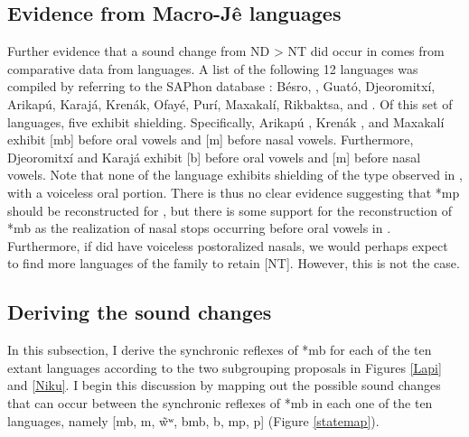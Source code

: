 \documentclass[output=paper,hidelinks]{langscibook}
\begin{document}
\subsection{Evidence from Macro-Jê languages}

Further evidence that a sound change from ND > NT did occur in  comes from comparative data from  languages. A list of the following 12  languages was compiled by referring to the SAPhon database \citep{saphon}: B\'es\textbari ro, , Guat\'o, Djeoromitx\'i, Arikap\'u, Karaj\'a, Kren\'ak, Ofay\'e, Pur\'i, Maxakal\'i, Rikbaktsa, and . Of this set of languages, five exhibit shielding. Specifically, Arikap\'u \citep{RibeiroVoort2010}, Kren\'ak \citep{Pessoa2012}, and Maxakal\'i \citep{Campos2009} exhibit [mb] before oral vowels and [m] before nasal vowels. Furthermore, Djeoromitx\'i \citep{RibeiroVoort2010} and Karaj\'a \citep{Ribeiro2012} exhibit [b] before oral vowels and [m] before nasal vowels. Note that none of the  language exhibits shielding of the type observed in , with a voiceless oral portion. There is thus no clear evidence suggesting that *mp should be reconstructed for , but there is some support for the reconstruction of *mb as the realization of nasal stops occurring before oral vowels in . Furthermore, if  did have voiceless postoralized nasals, we would perhaps expect to find more languages of the family to retain [NT]. However, this is not the case.

\subsection{Deriving the sound changes}

In this subsection, I derive the synchronic reflexes of  *mb for each of the ten extant  languages according to the two subgrouping proposals in Figures \ref{Lapi} and \ref{Niku}. I begin this discussion by mapping out the possible sound changes that can occur between the synchronic reflexes of *mb in each one of the ten  languages, namely [mb, m, \~wʷ, bmb, b, mp, p] (Figure \ref{statemap}).
\end{document}
